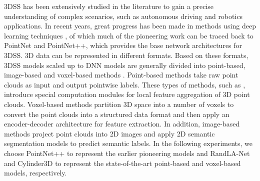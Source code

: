 \documentclass[journal]{IEEEtran}
\begin{document}
3DSS has been extensively studied in the literature to gain a precise understanding of complex scenarios, such as autonomous driving and robotics applications.
In recent years, great progress has been made in methods using deep learning techniques \cite{yulan2019review}\cite{gao2021we}, of which much of the pioneering work can be traced back to PointNet\cite{qi2017pointnet} and PointNet++\cite{qi2017pointnet++}, which provides the base network architectures for 3DSS.
3D data can be represented in different formats. Based on these formats, 3DSS models scaled up to DNN models are generally divided into point-based, image-based and voxel-based methods \cite{gao2021we}.
Point-based methods take raw point clouds as input and output pointwise labels. These types of methods, such as \cite{engelmann2017exploring}\cite{jiang2018pointsift}\cite{engelmann2018know}\cite{chen2019lsanet} \cite{zhiheng2019pyramnet}\cite{thomas2019kpconv}\cite{wu2019pointconv},\cite{hu2019randla} introduce special computation modules for local feature aggregation of 3D point clouds.
Voxel-based methods \cite{huang2016point}\cite{tchapmi2017segcloud}\cite{rethage2018fully}\cite{graham20183d}\cite{zhang2018efficient} \cite{zhou2020cylinder3d} partition 3D space into a number of voxels to convert the point clouds into a structured data format and then apply an encoder-decoder architecture for feature extraction. 
In addition, image-based methods \cite{wu2018squeezeseg}\cite{zhang2018liseg}\cite{wang2018pointseg}\cite{dewan2019deeptemporalseg}
\cite{wu2019squeezesegv2} \cite{milioto2019rangenet++} \cite{xu2020squeezesegv3} project point clouds into 2D images and apply 2D semantic segmentation models to predict semantic labels. 
In the following experiments, we choose PointNet++ \cite{qi2017pointnet++} to represent the earlier pioneering models and RandLA-Net \cite{hu2019randla} and Cylinder3D \cite{zhou2020cylinder3d} to represent the state-of-the-art point-based and voxel-based models, respectively.
\end{document}

